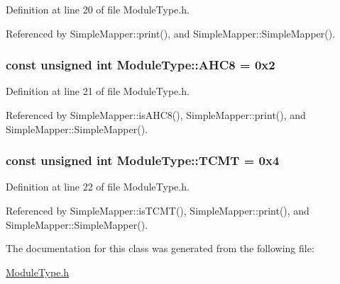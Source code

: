 Definition at line 20 of file ModuleType.h.

Referenced by SimpleMapper::print(), and SimpleMapper::SimpleMapper().\hypertarget{class_module_type_a9cbd6a48fabe66ed9d47d23e53d8c9b9}{
\subsubsection[{AHC8}]{\setlength{\rightskip}{0pt plus 5cm}const unsigned int {\bf ModuleType::AHC8} = 0x2}}
\label{class_module_type_a9cbd6a48fabe66ed9d47d23e53d8c9b9}


Definition at line 21 of file ModuleType.h.

Referenced by SimpleMapper::isAHC8(), SimpleMapper::print(), and SimpleMapper::SimpleMapper().\hypertarget{class_module_type_a64c7a7092ce31ace2f6e1a44918cd7cc}{
\subsubsection[{TCMT}]{\setlength{\rightskip}{0pt plus 5cm}const unsigned int {\bf ModuleType::TCMT} = 0x4}}
\label{class_module_type_a64c7a7092ce31ace2f6e1a44918cd7cc}


Definition at line 22 of file ModuleType.h.

Referenced by SimpleMapper::isTCMT(), SimpleMapper::print(), and SimpleMapper::SimpleMapper().

The documentation for this class was generated from the following file:\begin{DoxyCompactItemize}
\item 
\hyperlink{_module_type_8h}{ModuleType.h}\end{DoxyCompactItemize}
